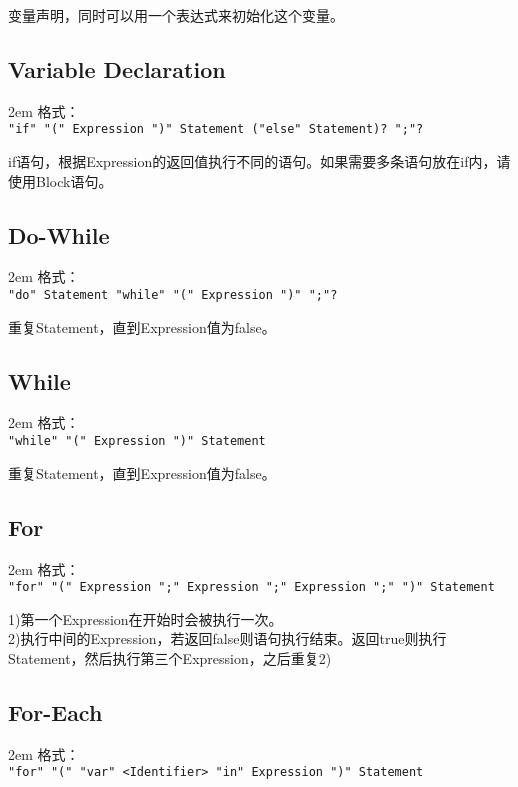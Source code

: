 \documentclass[a4paper]{article}
\begin{document}
\begin{CJK}{UTF8}{gbsn}
        变量声明，同时可以用一个表达式来初始化这个变量。


    \subsection{Variable Declaration}
        \hangindent 2em
        格式：\\
        {\tt "if" "(" Expression ")" Statement ("else" Statement)? ";"?}

        if语句，根据Expression的返回值执行不同的语句。如果需要多条语句放在if内，请使用Block语句。

    \subsection{Do-While}
        \hangindent 2em
        格式：\\
        {\tt "do" Statement "while" "(" Expression ")" ";"?}

        重复Statement，直到Expression值为false。

    \subsection{While}
        \hangindent 2em
        格式：\\
        {\tt "while" "(" Expression ")" Statement}

        重复Statement，直到Expression值为false。

    \subsection{For}
        \hangindent 2em
        格式：\\
        {\tt "for" "(" Expression ";" Expression ";" Expression ";" ")" Statement}

        1)第一个Expression在开始时会被执行一次。\\
        2)执行中间的Expression，若返回false则语句执行结束。返回true则执行Statement，然后执行第三个Expression，之后重复2)

    \subsection{For-Each}
        \hangindent 2em
        格式：\\
        {\tt "for" "(" "var" <Identifier> "in" Expression ")" Statement}


\end{CJK}
\end{document}
